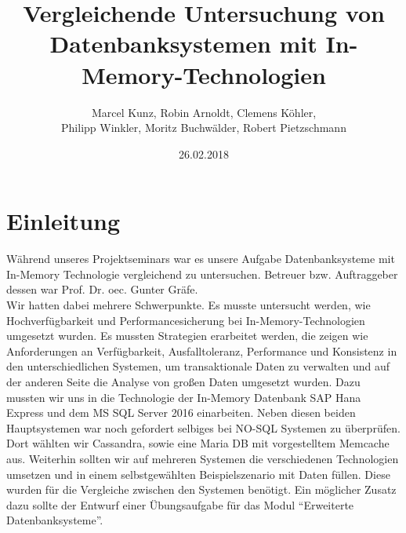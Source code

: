 \documentclass[a4paper, 12pt]{scrartcl}
\title{Vergleichende Untersuchung von Datenbanksystemen mit In-Memory-Technologien}
\author{Marcel Kunz, Robin Arnoldt, Clemens Köhler, \\ Philipp Winkler, Moritz Buchwälder, Robert Pietzschmann}
\date{26.02.2018}
\begin{document}
\maketitle
\newpage
\tableofcontents
\newpage

\section{Einleitung}
Während unseres Projektseminars war es unsere Aufgabe Datenbanksysteme mit In-Memory Technologie vergleichend zu untersuchen. Betreuer bzw. Auftraggeber dessen war Prof. Dr. oec. Gunter Gräfe.\\ Wir hatten dabei mehrere Schwerpunkte. Es musste untersucht werden, wie Hochverfügbarkeit und Performancesicherung bei In-Memory-Technologien umgesetzt wurden. Es mussten Strategien erarbeitet werden, die zeigen wie Anforderungen an Verfügbarkeit, Ausfalltoleranz, Performance und Konsistenz in den unterschiedlichen Systemen, um transaktionale Daten zu verwalten und auf der anderen Seite die Analyse von großen Daten umgesetzt wurden. Dazu mussten wir uns in die Technologie der In-Memory Datenbank SAP Hana Express und dem MS SQL Server 2016 einarbeiten. Neben diesen beiden Hauptsystemen war noch gefordert selbiges bei NO-SQL Systemen zu überprüfen. Dort wählten wir Cassandra, sowie eine Maria DB mit vorgestelltem Memcache aus. Weiterhin sollten wir auf mehreren Systemen die verschiedenen Technologien umsetzen und in einem selbstgewählten Beispielszenario mit Daten füllen. Diese wurden für die Vergleiche zwischen den Systemen benötigt. Ein möglicher Zusatz dazu sollte der Entwurf einer Übungsaufgabe für das Modul "`Erweiterte Datenbanksysteme"'.  
\end{document}
